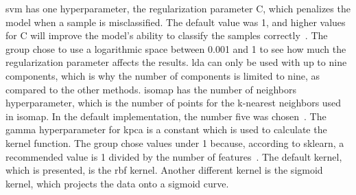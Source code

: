 \gls{svm} has one hyperparameter, the regularization parameter C, which penalizes the model when a sample is misclassified. The default value was 1, and higher values for C will improve the model's ability to classify the samples correctly~\cite{scikit-learn}. The group chose to use a logarithmic space between 0.001 and 1 to see how much the regularization parameter affects the results. \gls{lda} can only be used with up to nine components, which is why the number of components is limited to nine, as compared to the other methods. \gls{isomap} has the number of neighbors hyperparameter, which is the number of points for the k-nearest neighbors used in \gls{isomap}. In the default implementation, the number five was chosen~\cite{scikit-learn}. The gamma hyperparameter for \gls{kpca} is a constant which is used to calculate the kernel function. The group chose values under 1 because, according to sklearn, a recommended value is 1 divided by the number of features~\cite{scikit-learn}. The default kernel, which is presented, is the \gls{rbf} kernel. Another different kernel is the sigmoid kernel, which projects the data onto a sigmoid curve.
